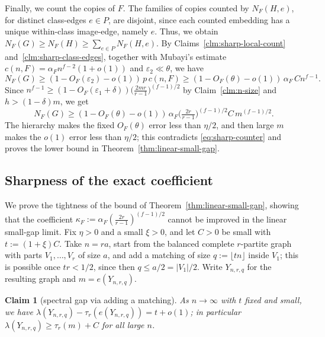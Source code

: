 \documentclass[11pt,a4paper]{article}
\newtheorem{claim}[theorem]{Claim}
\theoremstyle{definition}
\theoremstyle{plain}
\newcommand{\eps}{\varepsilon}
\newcommand{\Ksharp}{\kappa_{F}}
\renewcommand{\le}{\leqslant}
\renewcommand{\ge}{\geqslant}
\begin{document}
Finally, we count the copies of $F$.  
The families of copies counted by $N_F(H,e)$, for distinct class-edges $e\in P$, are disjoint, since each counted embedding has a unique within-class image-edge, namely $e$. Thus, we obtain $ N_F (G)\ge N_F (H)\ge\sum_{e\in P}N_F(H,e)$.  By Claims~\ref{clm:sharp-local-count} and~\ref{clm:sharp-class-edges}, together with Mubayi's estimate $c(n,F)=\alpha_Fn^{f-2}(1+o(1))$ and $\eps_2\ll\theta$, we have 
\[
   N_F (G)\ge(1-O_F(\eps_2)-o(1))\,p\,c(n,F)
  \ge(1-O_F(\theta)-o(1))\,\alpha_F\,Cn^{f-1}.
\]
Since $n^{f-1}\ge(1-O_F(\eps_1+\delta))\big(\tfrac{2mr}{r-1}\big)^{(f-1)/2}$ by Claim~\ref{clm:n-size} and $h>(1-\delta)m$, 
we get 
\[
   N_F (G)\ge(1-O_F(\theta)-o(1))\,\alpha_F\Big(\tfrac{2r}{r-1}\Big)^{(f-1)/2}C\,m^{(f-1)/2}.
\]
The hierarchy makes the fixed $O_F(\theta)$ error less than $\eta/2$, and then large $m$ makes the $o(1)$ error less than $\eta/2$; this contradicts \eqref{eq:sharp-counter} and proves the lower bound in Theorem~\ref{thm:linear-small-gap}. 


\subsection{Sharpness of the exact coefficient}\label{sec:sharpness}

We prove the tightness of  the bound of Theorem~\ref{thm:linear-small-gap}, showing that the coefficient $\Ksharp:=\alpha_F (\tfrac{2r}{r-1})^{(f-1)/2}$ cannot be improved in the linear small-gap limit. 
Fix $\eta>0$ and a small $\xi>0$, and let $C>0$ be small with $t:=(1+\xi)C$.  Take $n=ra$, start from the balanced complete $r$-partite graph with parts $V_1,\ldots,V_r$ of size $a$, and add a matching of size $q:=\lfloor tn\rfloor$ inside $V_1$; this is possible once $tr<1/2$, since then $q\le a/2=|V_1|/2$.  Write $Y_{n,r,q}$ for the resulting graph and $m=e(Y_{n,r,q})$.

\begin{claim}[spectral gap via adding a matching]\label{clm:matching-gap}
As $n\to\infty$ with $t$ fixed and small, we have $\lambda(Y_{n,r,q})-\tau_r(e(Y_{n,r,q}))=t+o(1)$; in particular $\lambda(Y_{n,r,q})\ge\tau_r(m)+C$ for all large $n$.
\end{claim}
\end{document}
